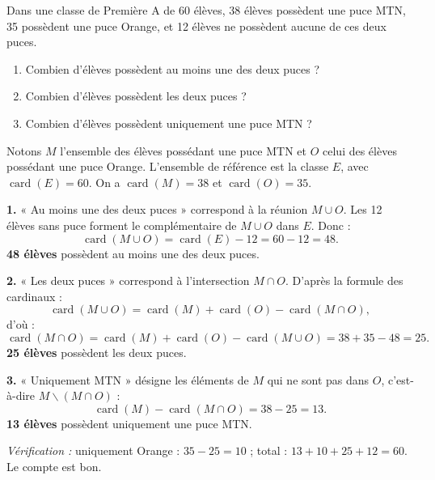 \documentclass[11pt]{article}
\newcommand{\legende}[1]{\par\vspace{6pt}{\popsemi\fontsize{9}{11.5}\selectfont\color{popmuted}#1}}
\def\setminus{\mathbin{\backslash}}\let\smallsetminus\setminus
\begin{document}
\begin{exoresolu}
Dans une classe de Première A de 60 élèves, 38 élèves possèdent une puce MTN, 35 possèdent une puce Orange, et 12 élèves ne possèdent aucune de ces deux puces.
\begin{enumerate}
\item Combien d'élèves possèdent au moins une des deux puces ?
\item Combien d'élèves possèdent les deux puces ?
\item Combien d'élèves possèdent uniquement une puce MTN ?
\end{enumerate}
\tcblower
Notons $M$ l'ensemble des élèves possédant une puce MTN et $O$ celui des élèves possédant une puce Orange. L'ensemble de référence est la classe $E$, avec $\operatorname{card}(E)=60$. On a $\operatorname{card}(M)=38$ et $\operatorname{card}(O)=35$.

\begin{popfigure}
\legende{Diagramme de Venn : répartition des 60 élèves}
\end{popfigure}

\textbf{1.} « Au moins une des deux puces » correspond à la réunion $M\cup O$. Les 12 élèves sans puce forment le complémentaire de $M\cup O$ dans $E$. Donc :
\[ \operatorname{card}(M\cup O)=\operatorname{card}(E)-12=60-12=48. \]
\textbf{48 élèves} possèdent au moins une des deux puces.

\textbf{2.} « Les deux puces » correspond à l'intersection $M\cap O$. D'après la formule des cardinaux :
\[ \operatorname{card}(M\cup O)=\operatorname{card}(M)+\operatorname{card}(O)-\operatorname{card}(M\cap O), \]
d'où :
\[ \operatorname{card}(M\cap O)=\operatorname{card}(M)+\operatorname{card}(O)-\operatorname{card}(M\cup O)=38+35-48=25. \]
\textbf{25 élèves} possèdent les deux puces.

\textbf{3.} « Uniquement MTN » désigne les éléments de $M$ qui ne sont pas dans $O$, c'est-à-dire $M\setminus (M\cap O)$ :
\[ \operatorname{card}(M)-\operatorname{card}(M\cap O)=38-25=13. \]
\textbf{13 élèves} possèdent uniquement une puce MTN.

\emph{Vérification :} uniquement Orange : $35-25=10$ ; total : $13+10+25+12=60$. Le compte est bon.
\end{exoresolu}
\end{document}
